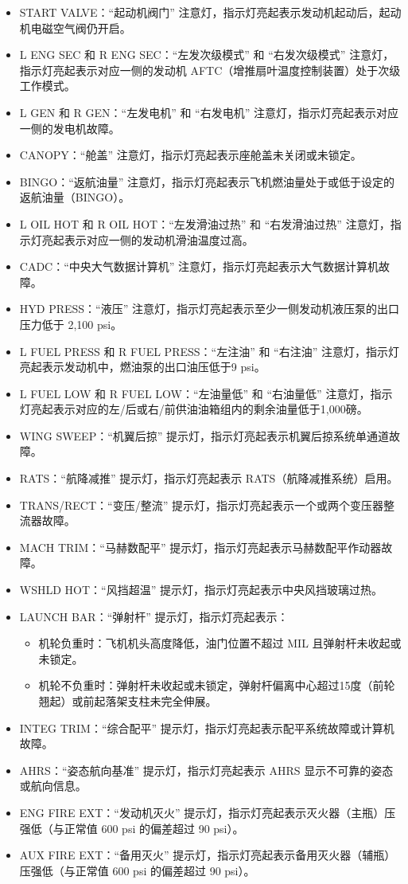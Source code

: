 \begin{itemize}
	\item START VALVE：“起动机阀门” 注意灯，指示灯亮起表示发动机起动后，起动机电磁空气阀仍开启。
	\item L ENG SEC 和 R ENG SEC：“左发次级模式” 和 “右发次级模式” 注意灯，指示灯亮起表示对应一侧的发动机 AFTC（增推扇叶温度控制装置）处于次级工作模式。
	\item L GEN 和 R GEN：“左发电机” 和 “右发电机” 注意灯，指示灯亮起表示对应一侧的发电机故障。
	\item CANOPY：“舱盖” 注意灯，指示灯亮起表示座舱盖未关闭或未锁定。
	\item BINGO：“返航油量” 注意灯，指示灯亮起表示飞机燃油量处于或低于设定的返航油量（BINGO）。
	\item L OIL HOT 和 R OIL HOT：“左发滑油过热” 和 “右发滑油过热” 注意灯，指示灯亮起表示对应一侧的发动机滑油温度过高。
	\item CADC：“中央大气数据计算机” 注意灯，指示灯亮起表示大气数据计算机故障。
	\item HYD PRESS：“液压” 注意灯，指示灯亮起表示至少一侧发动机液压泵的出口压力低于 2,100 psi。
	\item L FUEL PRESS 和 R FUEL PRESS：“左注油” 和 “右注油” 注意灯，指示灯亮起表示发动机中，燃油泵的出口油压低于9 psi。
	\item L FUEL LOW 和 R FUEL LOW：“左油量低” 和 “右油量低” 注意灯，指示灯亮起表示对应的左/后或右/前供油油箱组内的剩余油量低于1,000磅。
	\item WING SWEEP：“机翼后掠” 提示灯，指示灯亮起表示机翼后掠系统单通道故障。
	\item RATS：“航降减推” 提示灯，指示灯亮起表示 RATS（航降减推系统）启用。
	\item TRANS/RECT：“变压/整流” 提示灯，指示灯亮起表示一个或两个变压器整流器故障。
	\item MACH TRIM：“马赫数配平” 提示灯，指示灯亮起表示马赫数配平作动器故障。
	\item WSHLD HOT：“风挡超温” 提示灯，指示灯亮起表示中央风挡玻璃过热。
	\item LAUNCH BAR：“弹射杆” 提示灯，指示灯亮起表示：
	      \begin{itemize}
		      \item 机轮负重时：飞机机头高度降低，油门位置不超过 MIL 且弹射杆未收起或未锁定。
		      \item 机轮不负重时：弹射杆未收起或未锁定，弹射杆偏离中心超过15度（前轮翘起）或前起落架支柱未完全伸展。
	      \end{itemize}
	\item INTEG TRIM：“综合配平” 提示灯，指示灯亮起表示配平系统故障或计算机故障。
	\item AHRS：“姿态航向基准” 提示灯，指示灯亮起表示 AHRS 显示不可靠的姿态或航向信息。
	\item ENG FIRE EXT：“发动机灭火” 提示灯，指示灯亮起表示灭火器（主瓶）压强低（与正常值 600 psi 的偏差超过 90 psi）。
	\item AUX FIRE EXT：“备用灭火” 提示灯，指示灯亮起表示备用灭火器（辅瓶）压强低（与正常值 600 psi 的偏差超过 90 psi）。
\end{itemize}

